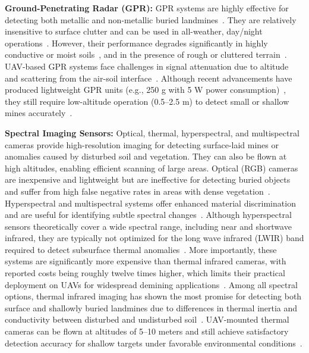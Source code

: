 \textbf{Ground-Penetrating Radar (GPR):} GPR systems are highly effective for detecting both metallic and non-metallic buried landmines~\cite{vsipovs2020lightweight,colorado2017integrated}. They are relatively insensitive to surface clutter and can be used in all-weather, day/night operations~\cite{noviello2022overview}. However, their performance degrades significantly in highly conductive or moist soils~\cite{lee2023modeling}, and in the presence of rough or cluttered terrain~\cite{yoo2021application}. UAV-based GPR systems face challenges in signal attenuation due to altitude and scattering from the air-soil interface~\cite{garcia2019autonomous}. Although recent advancements have produced lightweight GPR units (e.g., 250 g with 5 W power consumption)~\cite{colorado2017integrated}, they still require low-altitude operation (0.5--2.5 m) to detect small or shallow mines accurately~\cite{vsipovs2020lightweight,colorado2017integrated,fernandez2021development}.

\textbf{Spectral Imaging Sensors:} Optical, thermal, hyperspectral, and multispectral cameras provide high-resolution imaging for detecting surface-laid mines or anomalies caused by disturbed soil and vegetation. They can also be flown at high altitudes, enabling efficient scanning of large areas. Optical (RGB) cameras are inexpensive and lightweight but are ineffective for detecting buried objects and suffer from high false negative rates in areas with dense vegetation~\cite{Baur2021HowTI,6842242,rs16122046}. Hyperspectral and multispectral systems offer enhanced material discrimination and are useful for identifying subtle spectral changes~\cite{10765909}. Although hyperspectral sensors theoretically cover a wide spectral range, including near and shortwave infrared, they are typically not optimized for the long wave infrared (LWIR) band required to detect subsurface thermal anomalies~\cite{ptsa-qj43-23}. More importantly, these systems are significantly more expensive than thermal infrared cameras, with reported costs being roughly twelve times higher, which limits their practical deployment on UAVs for widespread demining applications~\cite{rs15040967}. Among all spectral options, thermal infrared imaging has shown the most promise for detecting both surface and shallowly buried landmines due to differences in thermal inertia and conductivity between disturbed and undisturbed soil~\cite{ptsa-qj43-23,10.1117/12.2177182,Fardoulis2020PROOFHS}. UAV-mounted thermal cameras can be flown at altitudes of 5--10 meters and still achieve satisfactory detection accuracy for shallow targets under favorable environmental conditions~\cite{TENORIOTAMAYO2024105567,rs15040967}.

